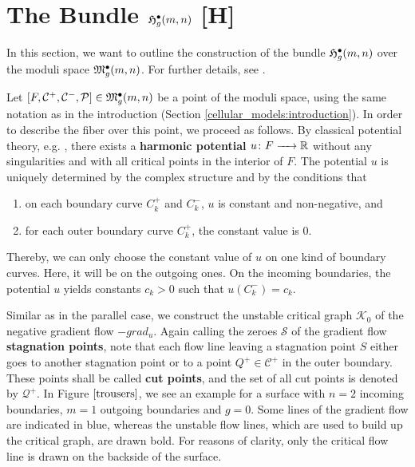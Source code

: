 \section{The Bundle \texorpdfstring{$\mathfrak{H}^{\bullet}_g(m, n)$}{{H\_g(m, n)}} [H]}
\label{cellular:radial_bundle}

In this section, we want to outline the construction of the bundle $\mathfrak{H}^{\bullet}_g(m, n)$ over the moduli space $\mathfrak{M}^\bullet_g(m, n)$.
For further details, see \cite{Boedigheimer2006}.

Let $[F, \mathcal C^+, \mathcal C^-, \mathcal P] \in \mathfrak{M}^\bullet_g(m, n)$ be a point of the moduli space, using the same notation as in the introduction (Section \ref{cellular_models:introduction}).
In order to describe the fiber over this point, we proceed as follows.
By classical potential theory, e.g. \cite[Theorem I.25]{opac-b1083717}, there exists a \textbf{harmonic potential} $u \colon F \xrightarrow{\hspace{6pt}{}\hspace{6pt}} \mathbb R$
without any singularities and with all critical points in the interior of $F$.
The potential $u$ is uniquely determined by the complex structure and by the conditions that 
\begin{enumerate}
 \item on each boundary curve $C^+_k$ and $C^-_k$, $u$ is constant and non-negative, and
 \item for each outer boundary curve $C^+_k$, the constant value is $0$.
\end{enumerate}
Thereby, we can only choose the constant value of $u$ on one kind of boundary curves.
Here, it will be on the outgoing ones.
On the incoming boundaries, the potential $u$ yields constants $c_k > 0$ such that $u(C^-_k) = c_k$.

Similar as in the parallel case, we construct the unstable critical graph $\mathcal K_0$ of the negative gradient flow $- grad_u$.
Again calling the zeroes $\mathcal S$ of the gradient flow \textbf{stagnation points},
note that each flow line leaving a stagnation point $S$ either goes to another stagnation point or to a point $Q^+ \in \mathcal C^+$ in the outer boundary.
These points shall be called \textbf{cut points}, and the set of all cut points is denoted by $\mathcal Q^+$.
In Figure $\ref{trousers}$, we see an example for a surface with $n = 2$ incoming boundaries, $m = 1$ outgoing boundaries and $g = 0$.
Some lines of the gradient flow are indicated in blue, whereas the unstable flow lines, which are used to build up the critical graph, are drawn bold.
For reasons of clarity, only the critical flow line is drawn on the backside of the surface.

